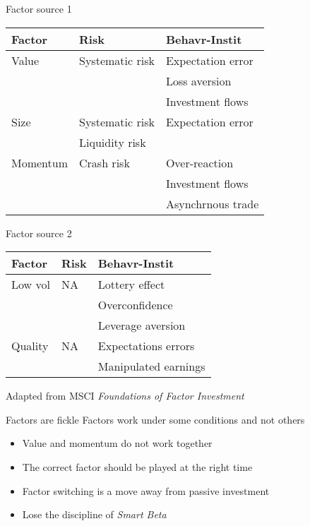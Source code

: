 \documentclass[14pt,xcolor=pdftex,dvipsnames,table]{beamer}\usepackage[]{graphicx}\usepackage[]{color}
\begin{document}
\begin{frame}{Factor source 1}
\begin{table}
\begin{center}
\begin{tabular}{l l l}
\textbf{Factor} & \textbf{Risk} & \textbf{Behavr-Instit}\\
\hline
Value & Systematic risk & Expectation error\\
      &                 & Loss aversion\\
      &                 & Investment flows\\
Size  & Systematic risk & Expectation error\\
      & Liquidity risk   & \\
Momentum & Crash risk & Over-reaction\\
        &             & Investment flows\\
        &             & Asynchrnous trade\\
\end{tabular}
\end{center}
\end{table}

\end{frame}

\begin{frame}{Factor source 2}
\begin{table}
\begin{center}
\begin{tabular}{l p{3cm} l}
\textbf{Factor} & \textbf{Risk} & \textbf{Behavr-Instit}\\
\hline
Low vol & NA          & Lottery effect\\
        &             & Overconfidence\\
        &             & Leverage aversion\\
Quality & NA          & Expectations errors\\
        &             & Manipulated earnings\\
\end{tabular}
\end{center}
\end{table}
Adapted from MSCI \emph{Foundations of Factor Investment}

\end{frame}

\begin{frame}{Factors are fickle}
Factors work under some conditions and not others
\begin{itemize}[<+-| alert@+>]
\pause
\item Value and momentum do not work together
\item The correct factor should be played at the right time
\item Factor switching is a move away from passive investment
\item Lose the discipline of \emph{Smart Beta}
\end{itemize}
\end{frame}
\end{document}
